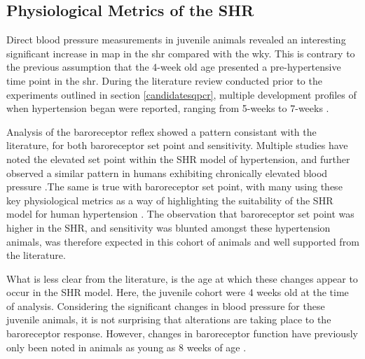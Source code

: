 \subsection{Physiological Metrics of the SHR}

Direct blood pressure measurements in juvenile animals revealed an interesting significant increase in \acrshort{map} in the \acrshort{shr} compared with the \acrshort{wky}. This is contrary to the previous assumption that the 4-week old age presented a pre-hypertensive time point in the \acrshort{shr}. During the literature review conducted prior to the experiments outlined in section \ref{candidatesqpcr}, multiple development profiles of when hypertension began were reported, ranging from 5-weeks to 7-weeks \cite{NAP20031,Yamori1984}. 

Analysis of the baroreceptor reflex showed a pattern consistant with the literature, for both baroreceptor set point and sensitivity. Multiple studies have noted the elevated set point within the SHR model of hypertension, and further observed a similar pattern in humans exhibiting chronically elevated blood pressure \cite{Sarenac2011,Narkiewicz2008}.The same is true with baroreceptor set point, with many using these key physiological metrics as a way of highlighting the suitability of the SHR model for human hypertension \cite{Monteiro2012,Bertagnolli2006}. The observation that baroreceptor set point was higher in the SHR, and sensitivity was blunted amongst these hypertension animals, was therefore expected in this cohort of animals and well supported from the literature. 

What is less clear from the literature, is the age at which these changes appear to occur in the SHR model. Here, the juvenile cohort were 4 weeks old at the time of analysis. Considering the significant changes in blood pressure for these juvenile animals, it is not surprising that alterations are taking place to the baroreceptor response. However, changes in baroreceptor function have previously only been noted in animals as young as 8 weeks of age \cite{Cisternas2010,Andresen1980,Parati1995}. 

